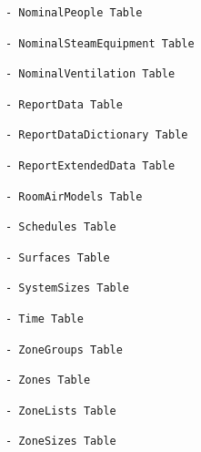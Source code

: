 \begin{lstlisting}
- NominalPeople Table
\end{lstlisting}

\begin{lstlisting}
- NominalSteamEquipment Table
\end{lstlisting}

\begin{lstlisting}
- NominalVentilation Table
\end{lstlisting}

\begin{lstlisting}
- ReportData Table
\end{lstlisting}

\begin{lstlisting}
- ReportDataDictionary Table
\end{lstlisting}

\begin{lstlisting}
- ReportExtendedData Table
\end{lstlisting}

\begin{lstlisting}
- RoomAirModels Table
\end{lstlisting}

\begin{lstlisting}
- Schedules Table
\end{lstlisting}

\begin{lstlisting}
- Surfaces Table
\end{lstlisting}

\begin{lstlisting}
- SystemSizes Table
\end{lstlisting}

\begin{lstlisting}
- Time Table
\end{lstlisting}

\begin{lstlisting}
- ZoneGroups Table
\end{lstlisting}

\begin{lstlisting}
- Zones Table
\end{lstlisting}

\begin{lstlisting}
- ZoneLists Table
\end{lstlisting}

\begin{lstlisting}
- ZoneSizes Table
\end{lstlisting}


